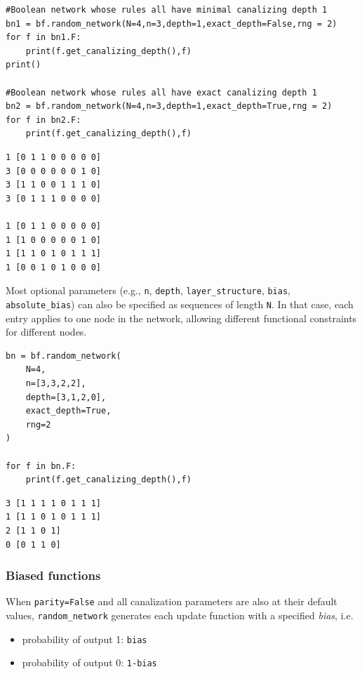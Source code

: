 \documentclass[
]{article}
\providecommand{\tightlist}{%
  \setlength{\itemsep}{0pt}\setlength{\parskip}{0pt}}
\begin{document}
\begin{lstlisting}
#Boolean network whose rules all have minimal canalizing depth 1
bn1 = bf.random_network(N=4,n=3,depth=1,exact_depth=False,rng = 2)
for f in bn1.F:
    print(f.get_canalizing_depth(),f) 
print()    

#Boolean network whose rules all have exact canalizing depth 1
bn2 = bf.random_network(N=4,n=3,depth=1,exact_depth=True,rng = 2)
for f in bn2.F:
    print(f.get_canalizing_depth(),f) 
\end{lstlisting}

\begin{lstlisting}
1 [0 1 1 0 0 0 0 0]
3 [0 0 0 0 0 0 1 0]
3 [1 1 0 0 1 1 1 0]
3 [0 1 1 1 0 0 0 0]

1 [0 1 1 0 0 0 0 0]
1 [1 0 0 0 0 0 1 0]
1 [1 1 0 1 0 1 1 1]
1 [0 0 1 0 1 0 0 0]
\end{lstlisting}

Most optional parameters (e.g., \texttt{n}, \texttt{depth},
\texttt{layer\_structure}, \texttt{bias}, \texttt{absolute\_bias}) can
also be specified as sequences of length \texttt{N}. In that case, each
entry applies to one node in the network, allowing different functional
constraints for different nodes.

\begin{lstlisting}
bn = bf.random_network(
    N=4,
    n=[3,3,2,2],
    depth=[3,1,2,0],
    exact_depth=True,
    rng=2
)

for f in bn.F:
    print(f.get_canalizing_depth(),f) 
\end{lstlisting}

\begin{lstlisting}
3 [1 1 1 1 0 1 1 1]
1 [1 1 0 1 0 1 1 1]
2 [1 1 0 1]
0 [0 1 1 0]
\end{lstlisting}

\subsubsection{Biased functions}\label{biased-functions}

When \texttt{parity=False} and all canalization parameters are also at
their default values, \texttt{random\_network} generates each update
function with a specified \emph{bias}, i.e.

\begin{itemize}
\tightlist
\item
  probability of output 1: \texttt{bias}
\item
  probability of output 0: \texttt{1-bias}
\end{itemize}
\end{document}
